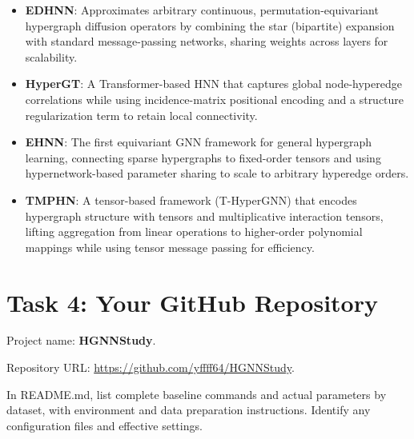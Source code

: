 \documentclass[11pt,a4paper]{article}
\begin{document}
\begin{itemize}
\item \textbf{EDHNN}\cite{wang2023edhnn}: Approximates arbitrary continuous, permutation-equivariant hypergraph diffusion operators by combining the star (bipartite) expansion with standard message-passing networks, sharing weights across layers for scalability.
\item \textbf{HyperGT}\cite{liu2024hypergt}: A Transformer-based HNN that captures global node-hyperedge correlations while using incidence-matrix positional encoding and a structure regularization term to retain local connectivity.
\item \textbf{EHNN}\cite{kim2022ehnn}: The first equivariant GNN framework for general hypergraph learning, connecting sparse hypergraphs to fixed-order tensors and using hypernetwork-based parameter sharing to scale to arbitrary hyperedge orders.
\item \textbf{TMPHN}\cite{wang2024tmphn}: A tensor-based framework (T-HyperGNN) that encodes hypergraph structure with tensors and multiplicative interaction tensors, lifting aggregation from linear operations to higher-order polynomial mappings while using tensor message passing for efficiency.
\end{itemize}

\section*{Task 4: Your GitHub Repository}
Project name: \textbf{HGNNStudy}.\par
Repository URL: \url{https://github.com/yffff64/HGNNStudy}.\par
In README.md, list complete baseline commands and actual parameters by dataset, with environment and data preparation instructions. Identify any configuration files and effective settings.



\end{document}
